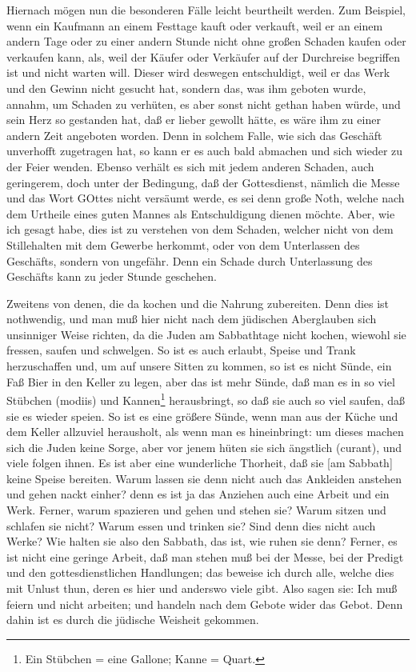 Hiernach mögen nun die besonderen Fälle leicht beurtheilt werden. Zum Beispiel, wenn ein Kaufmann an einem Festtage kauft oder verkauft, weil er an einem andern Tage oder zu einer andern Stunde nicht ohne großen Schaden kaufen oder verkaufen kann, als, weil der Käufer oder Verkäufer auf der Durchreise begriffen ist und nicht warten will. Dieser wird deswegen entschuldigt, weil er das Werk und den Gewinn nicht gesucht hat, sondern das, was ihm geboten wurde, annahm, um Schaden zu verhüten, es aber sonst nicht gethan haben würde, und sein Herz so gestanden hat, daß er lieber gewollt hätte, es wäre ihm zu einer andern Zeit angeboten worden. Denn in solchem Falle, wie sich das Geschäft unverhofft zugetragen hat, so kann er es auch bald abmachen und sich wieder zu der Feier wenden. Ebenso verhält es sich mit jedem anderen Schaden, auch geringerem, doch unter der Bedingung, daß der Gottesdienst, nämlich die Messe und das Wort GOttes nicht versäumt werde, es sei denn große Noth, welche nach dem Urtheile eines guten Mannes als Entschuldigung dienen möchte. Aber, wie ich gesagt habe, dies ist zu verstehen von dem Schaden, welcher nicht von dem Stillehalten mit dem Gewerbe herkommt, oder von dem Unterlassen des Geschäfts, sondern von ungefähr. Denn ein Schade durch Unterlassung des Geschäfts kann zu jeder Stunde geschehen.

Zweitens von denen, die da kochen und die Nahrung zubereiten. Denn dies ist nothwendig, und man muß hier nicht nach dem jüdischen Aberglauben sich unsinniger Weise richten, da die Juden am Sabbathtage nicht kochen, wiewohl sie fressen, saufen und schwelgen. So ist es auch erlaubt, Speise und Trank herzuschaffen und, um auf unsere Sitten zu kommen, so ist es nicht Sünde, ein Faß Bier in den Keller zu legen, aber das ist mehr Sünde, daß man es in so viel Stübchen (modiis) und Kannen\footnote{Ein Stübchen = eine Gallone; Kanne = Quart.} herausbringt, so daß sie auch so viel saufen, daß sie es wieder speien. So ist es eine größere Sünde, wenn man aus der Küche und dem Keller allzuviel herausholt, als wenn man es hineinbringt: um dieses machen sich die Juden keine Sorge, aber vor jenem hüten sie sich ängstlich (curant), und viele folgen ihnen. Es ist aber eine wunderliche Thorheit, daß sie [am Sabbath] keine Speise bereiten. Warum lassen sie denn nicht auch das Ankleiden anstehen und gehen nackt einher? denn es ist ja das Anziehen auch eine Arbeit und ein Werk. Ferner, warum spazieren und gehen und stehen sie? Warum sitzen und schlafen sie nicht? Warum essen und trinken sie? Sind denn dies nicht auch Werke? Wie halten sie also den Sabbath, das ist, wie ruhen sie denn? Ferner, es ist nicht eine geringe Arbeit, daß man stehen muß bei der Messe, bei der Predigt und den gottesdienstlichen Handlungen; das beweise ich durch alle, welche dies mit Unlust thun, deren es hier und anderswo viele gibt. Also sagen sie: Ich muß feiern und
nicht arbeiten; und handeln nach dem Gebote wider das Gebot. Denn dahin ist es durch die jüdische Weisheit gekommen.

